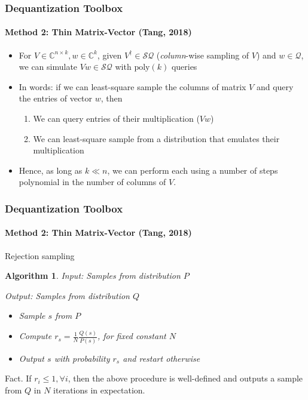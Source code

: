 \documentclass{beamer}
\newcommand\0{\mathbf{0}}
\newcommand\CC{\mathbb{C}}
\newcommand\<{\langle}
\renewcommand\>{\rangle}
\newtheorem{algorithm}{Algorithm}[theorem]
\begin{document}
\begin{frame}
\frametitle{Dequantization Toolbox}
\framesubtitle{Method 2: Thin Matrix-Vector (Tang, 2018)}
\begin{itemize}
	\item For $V \in \CC^{n\times k}, w \in \CC^k$, given $V^\dagger \in \mathcal{SQ}$ (\textit{column}-wise sampling of $V$) and $w \in \mathcal{Q}$, we can simulate $Vw \in \mathcal{SQ}$ with $\text{poly}(k)$ queries
	\item In words: if we can least-square sample the columns of matrix $V$ and query the entries of vector $w$, then
\begin{enumerate}
\item  We can query entries of their multiplication ($Vw$) 
\item We can least-square sample from a distribution that emulates their multiplication	
\end{enumerate}

\item Hence, as long as $k \ll n$, we can perform  each using a number of steps polynomial in the number of columns of $V$. 

\end{itemize}
\end{frame}

\begin{frame}
\frametitle{Dequantization Toolbox}
\framesubtitle{Method 2: Thin Matrix-Vector (Tang, 2018)}
\begin{definition}
Rejection sampling
\end{definition}
\begin{algorithm}
Input: Samples from distribution $P$

Output: Samples from distribution $Q$
\begin{itemize}
\item Sample $s$ from $P$
\item Compute $r_s = \frac{1}{N}\frac{Q(s)}{P(s)}$, for fixed constant $N$
\item Output $s$ with probability $r_s$ and restart otherwise
\end{itemize}
\end{algorithm}

\begin{fact}
Fact. If $r_i \leq 1, \forall i$, then the above procedure is well-defined and outputs a sample from $Q$ in $N$ iterations in expectation.	
\end{fact}


\end{frame}
\end{document}
